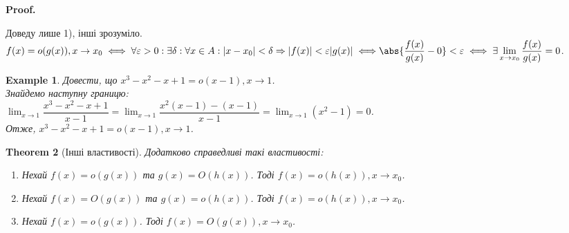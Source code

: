 \documentclass[a4paper, 14pt]{article}
\makeatletter
\def\qed{$\blacksquare$}
\theoremstyle{theoremdd}
\newtheorem{theorem}{Theorem}[subsection]
\theoremstyle{theoremdd}
\theoremstyle{theoremdd}
\theoremstyle{theoremdd}
\newtheorem{example}[theorem]{Example}
\theoremstyle{theoremdd}
\theoremstyle{theoremdd}
\theoremstyle{theoremdd}
\theoremstyle{theoremdd}
\renewenvironment{proof}[1][Proof.\\]{\par
\pushQED{\hfill \qed}%
\normalfont \topsep6\p@\@plus6\p@\relax
\trivlist
\item\relax
{\bfseries
#1\@addpunct{.}}\hspace\labelsep\ignorespaces
}{%
\popQED\endtrivlist\@endpefalse
}
\makeatother
\begin{document}
\begin{proof}
Доведу лише 1), інші зрозуміло.\\
$f(x) = o(g(x)),x \to x_0 \iff \forall \varepsilon>0: \exists \delta: \forall x \in A: |x-x_0| < \delta \Rightarrow |f(x)| < \varepsilon |g(x)| \iff \\ \displaystyle \abs{\frac{f(x)}{g(x)} - 0} < \varepsilon \iff \exists \lim_{x \to x_0} \frac{f(x)}{g(x)} = 0$.
\end{proof}

\begin{example}
Довести, що $x^3 - x^2 - x + 1 = o(x-1), x \to 1$.\\
Знайдемо наступну границю:\\
$\displaystyle \lim_{x \to 1} \dfrac{x^3-x^2-x+1}{x-1} = \lim_{x \to 1} \dfrac{x^2(x-1)-(x-1)}{x-1} = \lim_{x \to 1} (x^2-1) = 0$.\\
Отже, $x^3 - x^2 - x + 1 = o(x-1), x \to 1$.
\\ \iffalse %
\begin{figure} [H]
\centering
{
\begin{tikzpicture}
\draw[thick, ->] (-1.2,0)--(4,0) node[anchor = north] {$x$};
\draw[thick, ->] (0,-2)--(0,5) node[anchor = east] {$y$};


\draw[thick, domain=-1.2:2.2, variable=\x, samples = 1000] plot({\x}, {(\x)^3 - (\x)^2 - \x + 1}) node[anchor = south west, scale = 0.7] {$f(x) = x^3 - x^2 - x + 1$};
\draw[thick, domain=-1:2.2, variable=\x, samples = 1000] plot({\x}, {\x - 1}) node[anchor = south west, scale = 0.7] {$g(x) = x - 1$};
\end{tikzpicture}
\caption*{Тут $x-1$ миттєво стала нулем і миттєво пішла далі. А $x^3-x^2-x+1$ набагато довше була близька в нулі.}
}
\end{figure}
\fi %
\end{example}

\begin{theorem}[Інші властивості]
Додатково справедливі такі властивості:
\begin{enumerate}[nosep,wide=0pt,label={\arabic*)}]
\item Нехай $f(x) = o(g(x))$ та $g(x) = O(h(x))$. Тоді $f(x) = o(h(x)), x \to x_0$.
\item Нехай $f(x) = O(g(x))$ та $g(x) = o(h(x))$. Тоді $f(x) = o(h(x)), x \to x_0$.
\item Нехай $f(x) = o(g(x))$. Тоді $f(x) = O(g(x)), x \to x_0$.
\end{enumerate}
\end{theorem}
\end{document}
